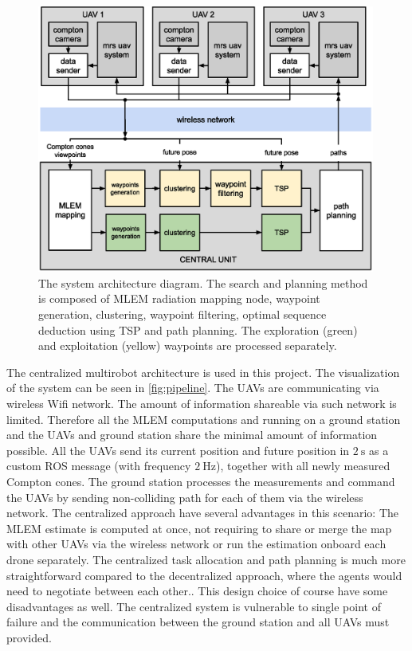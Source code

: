 \begin{figure}[!htb]
    \centering
    \includegraphics[width=0.99\textwidth]{./fig/photos/system_new.eps}
    \caption{\centering The system architecture diagram. The search and planning method is composed of \ac{MLEM} radiation mapping node, waypoint generation, clustering, waypoint filtering, optimal sequence deduction using TSP and path planning. The exploration (green) and exploitation (yellow) waypoints are processed separately.}
    \label{fig:sysarch}
\end{figure}

The centralized multirobot architecture is used in this project.
The visualization of the system can be seen in  \autoref{fig:pipeline}.
The \ac{UAV}s are communicating via wireless \ac{Wifi} network.
The amount of information shareable via such network is limited.
Therefore all the \ac{MLEM} computations and running on a ground station and the \ac{UAV}s and ground station share the minimal amount of information possible.
All the \ac{UAV}s send its current position and future position in $\SI{2}\second$ as a custom \ac{ROS} message (with frequency $\SI{2}\hertz$), 
together with all newly measured Compton cones.
The ground station processes the measurements and command the \ac{UAV}s by sending non-colliding path for each of them via the wireless network.
The centralized approach have several advantages in this scenario:
The \ac{MLEM} estimate is computed at once, not requiring to share or merge the map with other \ac{UAV}s via the wireless network or run the estimation onboard each drone separately.
The centralized task allocation and path planning is much more straightforward compared to the decentralized approach, where the agents would need to negotiate between each other..
This design choice of course have some disadvantages as well.
The centralized system is vulnerable to single point of failure and the communication between the ground station and all \ac{UAV}s must provided. 

